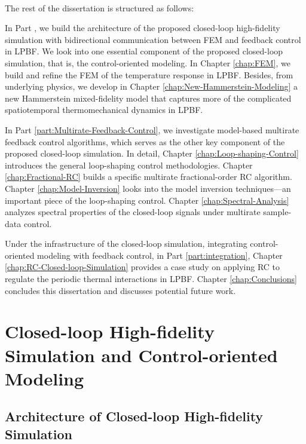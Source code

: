 \documentclass [11pt, proquest] {uwthesis}[2020/02/24]
\begin{document}
\

\noindent The rest of the dissertation is structured as follows:

In Part \ref{part:Closed-loop-Simulation}, we build the architecture of the proposed closed-loop high-fidelity simulation with bidirectional communication between FEM and feedback control in LPBF. We look into one essential component of the proposed closed-loop simulation, that is, the control-oriented modeling. In Chapter \ref{chap:FEM}, we build and refine the FEM of the temperature response in LPBF. Besides, from underlying physics, we develop in Chapter \ref{chap:New-Hammerstein-Modeling} a new Hammerstein mixed-fidelity model that captures more of the complicated spatiotemporal thermomechanical dynamics in LPBF.

In Part \ref{part:Multirate-Feedback-Control}, we investigate model-based multirate feedback control algorithms, which serves as the other key component of the proposed closed-loop simulation. In detail, Chapter \ref{chap:Loop-shaping-Control} introduces the general loop-shaping control methodologies. Chapter \ref{chap:Fractional-RC} builds a specific multirate fractional-order RC algorithm. Chapter \ref{chap:Model-Inversion} looks into the model inversion techniques---an important piece of the loop-shaping control. Chapter \ref{chap:Spectral-Analysis} analyzes spectral properties of the closed-loop signals under multirate sample-data control.

Under the infrastructure of the closed-loop simulation, integrating control-oriented modeling with feedback control, in Part \ref{part:integration}, Chapter \ref{chap:RC-Closed-loop-Simulation} provides a case study on applying RC to regulate the periodic thermal interactions in LPBF. Chapter \ref{chap:Conclusions} concludes this dissertation and discusses potential future work.


\part{Closed-loop High-fidelity Simulation and Control-oriented Modeling} \label{part:Closed-loop-Simulation}


\chapter{Architecture of Closed-loop High-fidelity Simulation} \label{chap:Closed-loop-Simulation}
\end{document}
